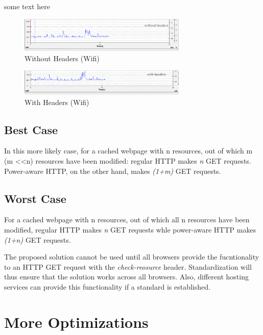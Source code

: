 \documentclass{sigplanconf}
\begin{document}
some text here

\begin{figure}[ht!]
\centering
\includegraphics[width=80mm]{wifi_withoutheaders.png}
\caption{Without Headers (Wifi) }
\label{fig:sp_gd_mnist}
\end{figure}

\begin{figure}[ht!]
\centering
\includegraphics[width=80mm]{wifi_withheaders.png}
\caption{With Headers (Wifi) }
\label{fig:sp_gd_mnist}
\end{figure}

\subsection{Best Case}

In this more likely case, for a cached webpage with n resources, out of which m (m \textless \textless n) resources have been modified: regular HTTP makes {\it n} GET requests. Power-aware HTTP, on the other hand, makes {\it (1+m)} GET requests.

\subsection{Worst Case}

For a cached webpage with n resources, out of which all n resources have been modified, regular HTTP
makes {\it n} GET requests whle power-aware HTTP makes {\it (1+n)} GET requests.

The proposed solution cannot be used until all browsers provide the fucntionality to an HTTP GET request with the {\it check-reosurce} header. Standardization will thus ensure that the solution works across all browsers. Also, different hosting services can provide this functionality if a standard is established.



\section{More Optimizations}
\end{document}
